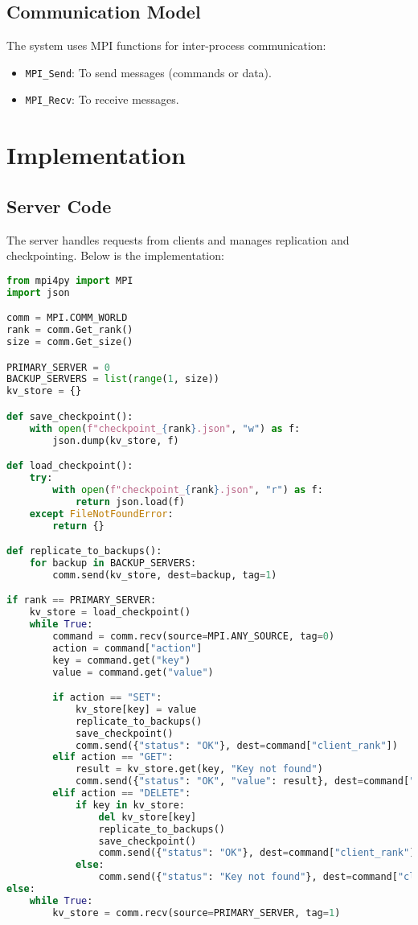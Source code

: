 \documentclass[12pt]{article}
\begin{document}
\subsection{Communication Model}
The system uses MPI functions for inter-process communication:
\begin{itemize}
    \item \texttt{MPI\_Send}: To send messages (commands or data).
    \item \texttt{MPI\_Recv}: To receive messages.
\end{itemize}

\section{Implementation}

\subsection{Server Code}
The server handles requests from clients and manages replication and checkpointing. Below is the implementation:

\lstset{caption=Server Code}
\begin{lstlisting}[language=Python]
from mpi4py import MPI
import json

comm = MPI.COMM_WORLD
rank = comm.Get_rank()
size = comm.Get_size()

PRIMARY_SERVER = 0
BACKUP_SERVERS = list(range(1, size))
kv_store = {}

def save_checkpoint():
    with open(f"checkpoint_{rank}.json", "w") as f:
        json.dump(kv_store, f)

def load_checkpoint():
    try:
        with open(f"checkpoint_{rank}.json", "r") as f:
            return json.load(f)
    except FileNotFoundError:
        return {}

def replicate_to_backups():
    for backup in BACKUP_SERVERS:
        comm.send(kv_store, dest=backup, tag=1)

if rank == PRIMARY_SERVER:
    kv_store = load_checkpoint()
    while True:
        command = comm.recv(source=MPI.ANY_SOURCE, tag=0)
        action = command["action"]
        key = command.get("key")
        value = command.get("value")

        if action == "SET":
            kv_store[key] = value
            replicate_to_backups()
            save_checkpoint()
            comm.send({"status": "OK"}, dest=command["client_rank"])
        elif action == "GET":
            result = kv_store.get(key, "Key not found")
            comm.send({"status": "OK", "value": result}, dest=command["client_rank"])
        elif action == "DELETE":
            if key in kv_store:
                del kv_store[key]
                replicate_to_backups()
                save_checkpoint()
                comm.send({"status": "OK"}, dest=command["client_rank"])
            else:
                comm.send({"status": "Key not found"}, dest=command["client_rank"])
else:
    while True:
        kv_store = comm.recv(source=PRIMARY_SERVER, tag=1)
\end{lstlisting}
\end{document}
